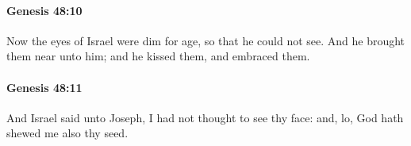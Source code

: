 		\paragraph{Genesis 48:10} %
			\label{GENESIS-48-10}

			Now the eyes of Israel were dim for age, so that he could not see. And he brought them near unto him; and he kissed them, and embraced them.


		\paragraph{Genesis 48:11} %
			\label{GENESIS-48-11}

			And Israel said unto Joseph, I had not thought to see thy face: and, lo, God hath shewed me also thy seed.


